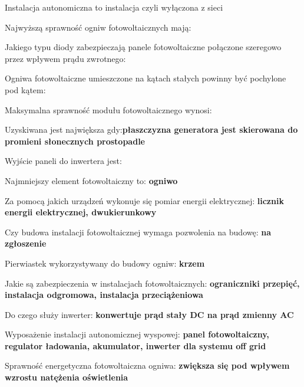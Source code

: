 \documentclass[12pt,a4paper]{article}
\begin{document}
Instalacja autonomiczna to instalacja \textbf{} czyli wyłączona z sieci 

Najwyższą sprawność ogniw fotowoltaicznych mają: \textbf{}

Jakiego typu diody zabezpieczają panele fotowoltaiczne połączone szeregowo przez wpływem prądu zwrotnego: \textbf{}

Ogniwa fotowoltaiczne umieszczone na kątach stałych powinny być pochylone  pod kątem: \textbf{}

Maksymalna sprawność modułu fotowoltaicznego wynosi: \textbf{}

Uzyskiwana \textbf{} jest największa gdy:\textbf{płaszczyzna generatora jest skierowana do promieni słonecznych prostopadle}

Wyjście paneli do inwertera jest:  \textbf{} 

Najmniejszy element fotowoltaiczny to: \textbf{ogniwo}

Za pomocą jakich urządzeń wykonuje się pomiar energii elektrycznej: \textbf{licznik energii elektrycznej, dwukierunkowy}

Czy budowa instalacji fotowoltaicznej wymaga pozwolenia na budowę:  \textbf{na zgłoszenie}

Pierwiastek wykorzystywany do budowy ogniw: \textbf{krzem}

Jakie są zabezpieczenia w instalacjach fotowoltaicznych: \textbf{ograniczniki przepięć, instalacja odgromowa, instalacja przeciążeniowa}

Do czego służy inwerter: \textbf{konwertuje prąd stały DC na prąd zmienny AC}

Wyposażenie instalacji  autonomicznej wyspowej: \textbf{panel fotowoltaiczny, regulator ładowania, akumulator, inwerter dla systemu off grid}

Sprawność energetyczna fotowoltaiczna ogniwa: \textbf{zwiększa się pod wpływem wzrostu natężenia oświetlenia}
\end{document}
